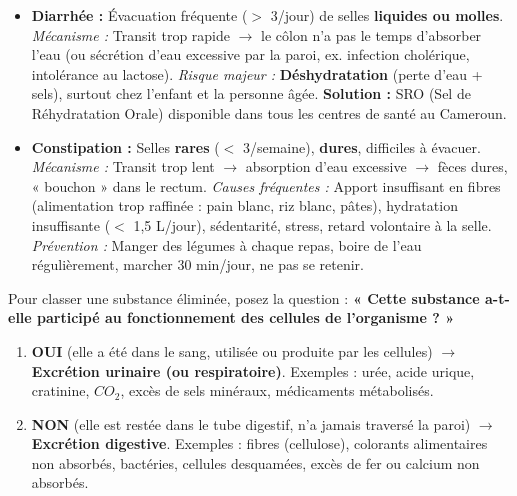 \documentclass[11pt]{article}
\begin{document}
\begin{propriete}
\begin{itemize}
    \item \textbf{Diarrhée :} Évacuation fréquente ($>$ 3/jour) de selles \textbf{liquides ou molles}.
          \textit{Mécanisme :} Transit trop rapide $\rightarrow$ le côlon n'a pas le temps d'absorber l'eau (ou sécrétion d'eau excessive par la paroi, ex. infection cholérique, intolérance au lactose).
          \textit{Risque majeur :} \textbf{Déshydratation} (perte d'eau + sels), surtout chez l'enfant et la personne âgée. \textbf{Solution :} SRO (Sel de Réhydratation Orale) disponible dans tous les centres de santé au Cameroun.
    \item \textbf{Constipation :} Selles \textbf{rares} ($<$ 3/semaine), \textbf{dures}, difficiles à évacuer.
          \textit{Mécanisme :} Transit trop lent $\rightarrow$ absorption d'eau excessive $\rightarrow$ fèces dures, « bouchon » dans le rectum.
          \textit{Causes fréquentes :} Apport insuffisant en fibres (alimentation trop raffinée : pain blanc, riz blanc, pâtes), hydratation insuffisante ($<$ 1,5 L/jour), sédentarité, stress, retard volontaire à la selle.
          \textit{Prévention :} Manger des légumes à chaque repas, boire de l'eau régulièrement, marcher 30 min/jour, ne pas se retenir.
\end{itemize}
\end{propriete}

\begin{methode}
Pour classer une substance éliminée, posez la question : \textbf{« Cette substance a-t-elle participé au fonctionnement des cellules de l'organisme ? »}
\begin{enumerate}
    \item \textbf{OUI} (elle a été dans le sang, utilisée ou produite par les cellules) $\rightarrow$ \textbf{Excrétion urinaire (ou respiratoire)}. Exemples : urée, acide urique, cratinine, $CO_2$, excès de sels minéraux, médicaments métabolisés.
    \item \textbf{NON} (elle est restée dans le tube digestif, n'a jamais traversé la paroi) $\rightarrow$ \textbf{Excrétion digestive}. Exemples : fibres (cellulose), colorants alimentaires non absorbés, bactéries, cellules desquamées, excès de fer ou calcium non absorbés.
\end{enumerate}
\end{methode}
\end{document}
